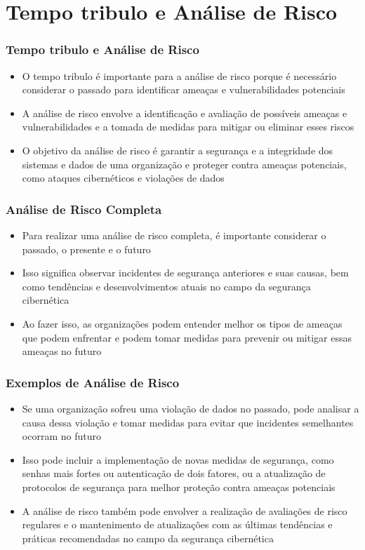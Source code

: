 \section{Tempo tribulo e Análise de Risco}

\begin{frame}
  \frametitle{Tempo tribulo e Análise de Risco}
  \begin{itemize}
    \item O tempo tribulo é importante para a análise de risco porque é necessário considerar o passado para identificar ameaças e vulnerabilidades potenciais
    \item A análise de risco envolve a identificação e avaliação de possíveis ameaças e vulnerabilidades e a tomada de medidas para mitigar ou eliminar esses riscos
    \item O objetivo da análise de risco é garantir a segurança e a integridade dos sistemas e dados de uma organização e proteger contra ameaças potenciais, como ataques cibernéticos e violações de dados
  \end{itemize}
\end{frame}

\begin{frame}
  \frametitle{Análise de Risco Completa}
  \begin{itemize}
    \item Para realizar uma análise de risco completa, é importante considerar o passado, o presente e o futuro
    \item Isso significa observar incidentes de segurança anteriores e suas causas, bem como tendências e desenvolvimentos atuais no campo da segurança cibernética
    \item Ao fazer isso, as organizações podem entender melhor os tipos de ameaças que podem enfrentar e podem tomar medidas para prevenir ou mitigar essas ameaças no futuro
  \end{itemize}
\end{frame}

\begin{frame}
  \frametitle{Exemplos de Análise de Risco}
  \begin{itemize}
    \item Se uma organização sofreu uma violação de dados no passado, pode analisar a causa dessa violação e tomar medidas para evitar que incidentes semelhantes ocorram no futuro
    \item Isso pode incluir a implementação de novas medidas de segurança, como senhas mais fortes ou autenticação de dois fatores, ou a atualização de protocolos de segurança para melhor proteção contra ameaças potenciais
    \item A análise de risco também pode envolver a realização de avaliações de risco regulares e o mantenimento de atualizações com as últimas tendências e práticas recomendadas no campo da segurança cibernética
  \end{itemize}
\end{frame}

